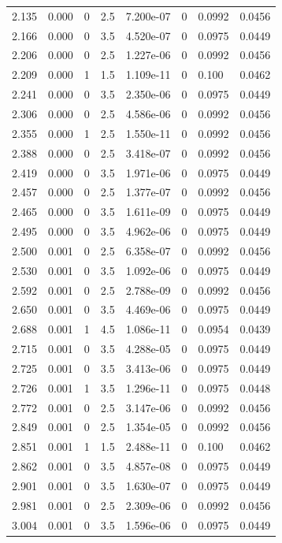 \documentclass[preview]{standalone}
\begin{document}
{{{\begin{tabular}{L{1.2cm}C{1.2cm} C{0.3cm}C{0.5cm} C{1.4cm}C{1.4cm} C{1.4cm}C{1.4cm}}
  2.135  &  0.000  & 0     & 2.5 &  7.200e-07  & 0  & 0.0992 &  0.0456   \\ 
  2.166  &  0.000  & 0     & 3.5 &  4.520e-07  & 0  & 0.0975 &  0.0449   \\ 
  2.206  &  0.000  & 0     & 2.5 &  1.227e-06  & 0  & 0.0992 &  0.0456   \\ 
  2.209  &  0.000  & 1     & 1.5 &  1.109e-11  & 0  & 0.100 &  0.0462   \\ 
  2.241  &  0.000  & 0     & 3.5 &  2.350e-06  & 0  & 0.0975 &  0.0449   \\ 
  2.306  &  0.000  & 0     & 2.5 &  4.586e-06  & 0  & 0.0992 &  0.0456   \\ 
  2.355  &  0.000  & 1     & 2.5 &  1.550e-11  & 0  & 0.0992 &  0.0456   \\ 
  2.388  &  0.000  & 0     & 2.5 &  3.418e-07  & 0  & 0.0992 &  0.0456   \\ 
  2.419  &  0.000  & 0     & 3.5 &  1.971e-06  & 0  & 0.0975 &  0.0449   \\ 
  2.457  &  0.000  & 0     & 2.5 &  1.377e-07  & 0  & 0.0992 &  0.0456   \\ 
  2.465  &  0.000  & 0     & 3.5 &  1.611e-09  & 0  & 0.0975 &  0.0449   \\ 
  2.495  &  0.000  & 0     & 3.5 &  4.962e-06  & 0  & 0.0975 &  0.0449   \\ 
  2.500  &  0.001  & 0     & 2.5 &  6.358e-07  & 0  & 0.0992 &  0.0456   \\ 
  2.530  &  0.001  & 0     & 3.5 &  1.092e-06  & 0  & 0.0975 &  0.0449   \\ 
  2.592  &  0.001  & 0     & 2.5 &  2.788e-09  & 0  & 0.0992 &  0.0456   \\ 
  2.650  &  0.001  & 0     & 3.5 &  4.469e-06  & 0  & 0.0975 &  0.0449   \\ 
  2.688  &  0.001  & 1     & 4.5 &  1.086e-11  & 0  & 0.0954 &  0.0439   \\ 
  2.715  &  0.001  & 0     & 3.5 &  4.288e-05  & 0  & 0.0975 &  0.0449   \\ 
  2.725  &  0.001  & 0     & 3.5 &  3.413e-06  & 0  & 0.0975 &  0.0449   \\ 
  2.726  &  0.001  & 1     & 3.5 &  1.296e-11  & 0  & 0.0975 &  0.0448   \\ 
  2.772  &  0.001  & 0     & 2.5 &  3.147e-06  & 0  & 0.0992 &  0.0456   \\ 
  2.849  &  0.001  & 0     & 2.5 &  1.354e-05  & 0  & 0.0992 &  0.0456   \\ 
  2.851  &  0.001  & 1     & 1.5 &  2.488e-11  & 0  & 0.100 &  0.0462   \\ 
  2.862  &  0.001  & 0     & 3.5 &  4.857e-08  & 0  & 0.0975 &  0.0449   \\ 
  2.901  &  0.001  & 0     & 3.5 &  1.630e-07  & 0  & 0.0975 &  0.0449   \\ 
  2.981  &  0.001  & 0     & 2.5 &  2.309e-06  & 0  & 0.0992 &  0.0456   \\ 
  3.004  &  0.001  & 0     & 3.5 &  1.596e-06  & 0  & 0.0975 &  0.0449   \\ 
\hline 
\end{tabular} 

}}}
\end{document}

